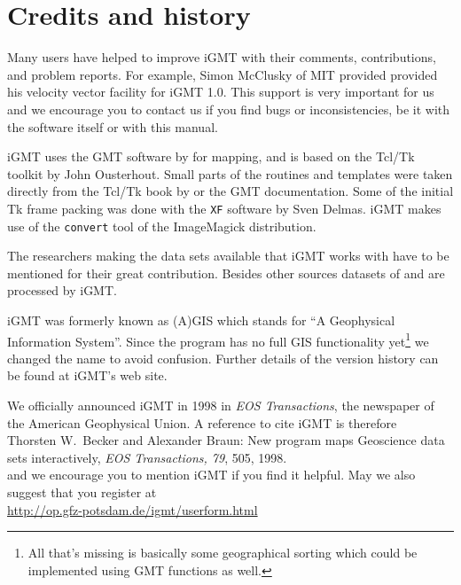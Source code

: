 \documentclass[11pt]{article}
\begin{document}
\section{Credits and history}

Many users have helped to improve iGMT with their comments,
contributions, and problem reports. For example, Simon McClusky of MIT
provided provided his velocity vector facility for iGMT 1.0.  This
support is very important for us and we encourage you to contact us if
you find bugs or inconsistencies, be it with the software itself or
with this manual.


iGMT uses the GMT software by \cite{gmt,wessel95,wessel98} for
mapping, and is based on the Tcl/Tk toolkit by John Ousterhout. Small
parts of the routines and templates were taken directly from the
Tcl/Tk book by \cite{ousterhout} or the GMT documentation.  Some of
the initial Tk frame packing was done with the {\tt XF} software by
Sven Delmas. iGMT makes use of the {\tt convert} tool of the
ImageMagick distribution.


The researchers making the data sets available that iGMT works with
have to be mentioned for their great contribution. Besides other
sources datasets of \cite{etopo5,smith97,
  sandwell97,mueller97,ngdc_sig,demets90,steinberger00b,simkin94,cmtreview}
and \cite{rapp91} are processed by iGMT.

iGMT was formerly known as (A)GIS which stands for ``A Geophysical
Information System''. Since the program has no full GIS functionality
yet\footnote{All that's missing is basically some geographical sorting
  which could be implemented using GMT functions as well.}  we changed
the name to avoid confusion. Further details of the version history
can be found at iGMT's web site.

We officially announced iGMT in 1998 in {\em EOS Transactions}, the
newspaper of the American Geophysical Union. A  reference to cite iGMT
is therefore\\

Thorsten W.\ Becker and Alexander Braun: New program maps Geoscience data sets
    interactively, {\em EOS Transactions, 79}, 505, 1998. \\
    
    and we encourage you to mention iGMT if you find it helpful. May
    we also suggest that you register at\\

\url{http://op.gfz-potsdam.de/igmt/userform.html}\\
\end{document}

